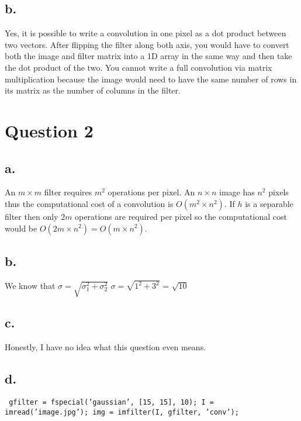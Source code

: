 \documentclass{article}
\begin{document}
\subsection*{b.}

Yes, it is possible to write a convolution in one pixel as a dot product between two vectors. After flipping the filter along both axis, you would have to convert both the image and filter matrix into a 1D array in the same way and then take the dot product of the two. You cannot write a full convolution via matrix multiplication because the image would need to have the same number of rows in its matrix as the number of columns in the filter.

\section*{Question 2}

\subsection*{a.}
An $m \times m$ filter requires $m^{2}$ operations per pixel. An $n \times n$ image has $n^{2}$ pixels thus the computational cost of a convolution is $O(m^{2} \times n^{2})$. If $h$ is a separable filter then only $2m$ operations are required per pixel so the computational cost would be $O(2m \times n^{2}) = O(m \times n^{2})$.

\subsection*{b.}
We know that $\sigma  = \sqrt{\sigma^{2}_{1} + \sigma^{2}_{2}}$
\newline\newline
$\sigma = \sqrt{1^{2} + 3^{2}}$ = $\sqrt{10}$

\subsection*{c.}
Honestly, I have no idea what this question even means.

\subsection*{d.}
\texttt{\noindent
gfilter = fspecial('gaussian', [15, 15],  10);
\newline
I = imread('image.jpg');
\newline
img = imfilter(I, gfilter, 'conv');
}
\end{document}
